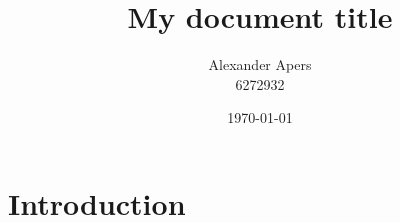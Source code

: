 \documentclass[a4paper]{article}
\title{\huge{My document title}}
\author{Alexander Apers \\ 6272932}
\affil{\small{Utrecht University\\ \href{a.p.apers@uu.nl}{a.p.apers@uu.nl}}}
\date{\today}
\begin{document}
    \maketitle
    \tableofcontents

    \section{Introduction}
    \lipsum
\end{document}
